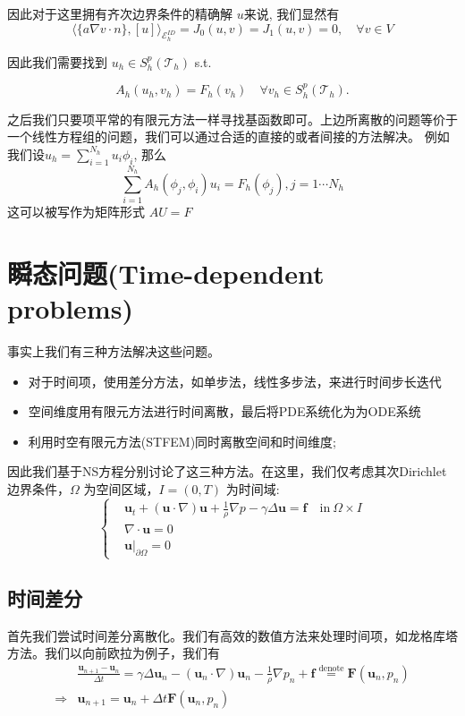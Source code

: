 因此对于这里拥有齐次边界条件的精确解 $u$来说, 我们显然有
$$\langle\{a \nabla v \cdot n\},[u]\rangle_{\mathcal{E}_{h}^{I D}}=J_{0}(u, v)=J_{1}(u, v)=0, \quad \forall v \in V$$

因此我们需要找到 $ u_{h} \in S_h^p(\mathscr{T}_h)$ s.t.

$$A_{h}\left(u_{h}, v_{h}\right)=F_h(v_h) \quad \forall v_{h} \in S_h^p(\mathscr{T}_h) .$$

之后我们只要项平常的有限元方法一样寻找基函数即可。上边所离散的问题等价于一个线性方程组的问题，我们可以通过合适的直接的或者间接的方法解决。
例如我们设$u_h=\sum_{i=1}^{N_h}u_i\phi_i$, 那么 
$$\sum_{i=1}^{N_h}A_h(\phi_j,\phi_i)u_i=F_h(\phi_j),j=1\cdots N_h$$
这可以被写作为矩阵形式 $AU=F$


\section{瞬态问题(Time-dependent problems)}
事实上我们有三种方法解决这些问题。
\begin{itemize}
    \item 对于时间项，使用差分方法，如单步法，线性多步法，来进行时间步长迭代
    \item 空间维度用有限元方法进行时间离散，最后将PDE系统化为为ODE系统
    \item 利用时空有限元方法(STFEM)同时离散空间和时间维度;
\end{itemize}

因此我们基于NS方程分别讨论了这三种方法。在这里，我们仅考虑其次Dirichlet边界条件，$\Omega$ 为空间区域，$I=(0,T)$ 为时间域:
$$\left\{
    \begin{aligned}
        &\textbf{u}_t+(\textbf{u}\cdot \nabla)\textbf{u}+\frac{1}{\rho}\nabla p-\gamma \Delta \textbf{u}=\textbf{f}\quad \text{in} \ \Omega\times I\\
        &\nabla \cdot \textbf{u}=0\\
        &\textbf{u}|_{\partial \Omega}=0
    \end{aligned}
\right.$$

\subsection{时间差分}
首先我们尝试时间差分离散化。我们有高效的数值方法来处理时间项，如龙格库塔方法。我们以向前欧拉为例子，我们有
\begin{equation}
    \begin{aligned}
    &\frac{\textbf{u}_{n+1}-\textbf{u}_n}{\Delta t}=\gamma \Delta \textbf{u}_n-(\textbf{u}_n\cdot \nabla) \textbf{u}_n-\frac{1}{\rho}\nabla p_n+\textbf{f}\stackrel{\text{denote}}{=}\textbf{F}(\textbf{u}_n,p_n)\\
    \Rightarrow&\textbf{u}_{n+1}=\textbf{u}_n+\Delta t \textbf{F}(\textbf{u}_n,p_n)
    \end{aligned}  
    \label{1}
\end{equation}

